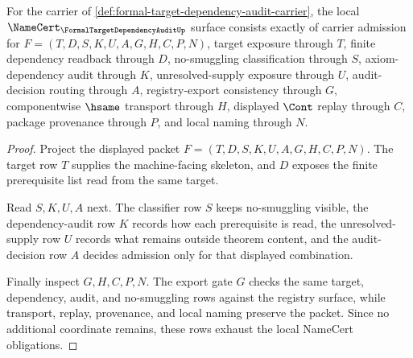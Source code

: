 \begin{theorem}
\label{thm:formal-target-dependency-audit-namecert-obligations}
For the carrier of \autoref{def:formal-target-dependency-audit-carrier}, the local $\NameCert_{\FormalTargetDependencyAuditUp}$ surface consists exactly of carrier admission for $F=(T,D,S,K,U,A,G,H,C,P,N)$, target exposure through $T$, finite dependency readback through $D$, no-smuggling classification through $S$, axiom-dependency audit through $K$, unresolved-supply exposure through $U$, audit-decision routing through $A$, registry-export consistency through $G$, componentwise $\hsame$ transport through $H$, displayed $\Cont$ replay through $C$, package provenance through $P$, and local naming through $N$.
\end{theorem}
\begin{proof}
Project the displayed packet $F=(T,D,S,K,U,A,G,H,C,P,N)$. The target row $T$ supplies the machine-facing skeleton, and $D$ exposes the finite prerequisite list read from the same target.

Read $S,K,U,A$ next. The classifier row $S$ keeps no-smuggling visible, the dependency-audit row $K$ records how each prerequisite is read, the unresolved-supply row $U$ records what remains outside theorem content, and the audit-decision row $A$ decides admission only for that displayed combination.

Finally inspect $G,H,C,P,N$. The export gate $G$ checks the same target, dependency, audit, and no-smuggling rows against the registry surface, while transport, replay, provenance, and local naming preserve the packet. Since no additional coordinate remains, these rows exhaust the local NameCert obligations.
\end{proof}

